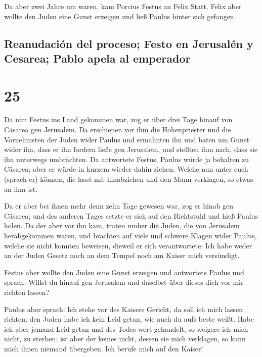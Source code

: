 Da aber zwei Jahre um waren, kam Porcius Festus an Felix
Statt. Felix aber wollte den Juden eine Gunst erzeigen und ließ Paulus
hinter sich gefangen.

\hypertarget{reanudaciuxf3n-del-proceso-festo-en-jerusaluxe9n-y-cesarea-pablo-apela-al-emperador}{%
\subsection{Reanudación del proceso; Festo en Jerusalén y Cesarea; Pablo
apela al
emperador}\label{reanudaciuxf3n-del-proceso-festo-en-jerusaluxe9n-y-cesarea-pablo-apela-al-emperador}}

\hypertarget{section-24}{%
\section{25}\label{section-24}}

 Da nun Festus ins Land gekommen war, zog er über drei
Tage hinauf von Cäsarea gen Jerusalem.  Da erschienen vor
ihm die Hohenpriester und die Vornehmsten der Juden wider Paulus und
ermahnten ihn  und baten um Gunst wider ihn, dass er ihn
fordern ließe gen Jerusalem, und stellten ihm nach, dass sie ihn
unterwegs umbrächten.  Da antwortete Festus, Paulus würde
ja behalten zu Cäsarea; aber er würde in kurzem wieder dahin ziehen.
 Welche nun unter euch (sprach er) können, die lasst mit
hinabziehen und den Mann verklagen, so etwas an ihm ist.

 Da er aber bei ihnen mehr denn zehn Tage gewesen war, zog
er hinab gen Cäsarea; und des anderen Tages setzte er sich auf den
Richtstuhl und hieß Paulus holen.  Da der aber vor ihn
kam, traten umher die Juden, die von Jerusalem herabgekommen waren, und
brachten auf viele und schwere Klagen wider Paulus, welche sie nicht
konnten beweisen,  dieweil er sich verantwortete: Ich habe
weder an der Juden Gesetz noch an dem Tempel noch am Kaiser mich
versündigt.

 Festus aber wollte den Juden eine Gunst erzeigen und
antwortete Paulus und sprach: Willst du hinauf gen Jerusalem und
daselbst über dieses dich vor mir richten lassen?

 Paulus aber sprach: Ich stehe vor des Kaisers Gericht,
da soll ich mich lassen richten; den Juden habe ich kein Leid getan, wie
auch du aufs beste weißt.  Habe ich aber jemand Leid
getan und des Todes wert gehandelt, so weigere ich mich nicht, zu
sterben; ist aber der keines nicht, dessen sie mich verklagen, so kann
mich ihnen niemand übergeben. Ich berufe mich auf den Kaiser!

